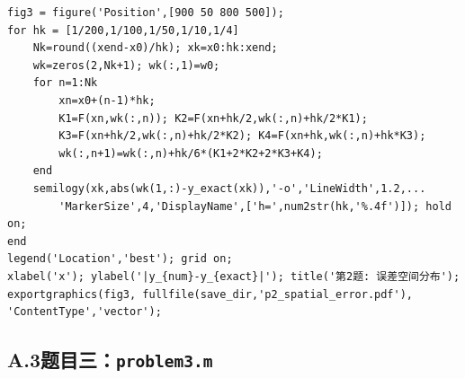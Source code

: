 \documentclass[UTF8,a4paper,11pt]{article}
\begin{document}
\begin{lstlisting}[style=matlab, caption={\texttt{problem2.m}：二阶 ODE 化为一阶系统后用 RK4 求解，分析收敛阶}]
% 图3: 不同步长误差空间分布
fig3 = figure('Position',[900 50 800 500]);
for hk = [1/200,1/100,1/50,1/10,1/4]
    Nk=round((xend-x0)/hk); xk=x0:hk:xend;
    wk=zeros(2,Nk+1); wk(:,1)=w0;
    for n=1:Nk
        xn=x0+(n-1)*hk;
        K1=F(xn,wk(:,n)); K2=F(xn+hk/2,wk(:,n)+hk/2*K1);
        K3=F(xn+hk/2,wk(:,n)+hk/2*K2); K4=F(xn+hk,wk(:,n)+hk*K3);
        wk(:,n+1)=wk(:,n)+hk/6*(K1+2*K2+2*K3+K4);
    end
    semilogy(xk,abs(wk(1,:)-y_exact(xk)),'-o','LineWidth',1.2,...
        'MarkerSize',4,'DisplayName',['h=',num2str(hk,'%.4f')]); hold on;
end
legend('Location','best'); grid on;
xlabel('x'); ylabel('|y_{num}-y_{exact}|'); title('第2题: 误差空间分布');
exportgraphics(fig3, fullfile(save_dir,'p2_spatial_error.pdf'), 'ContentType','vector');
\end{lstlisting}

\subsection*{A.3\quad 题目三：\texttt{problem3.m}}
\end{document}
